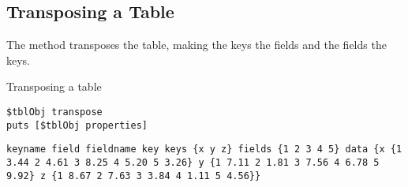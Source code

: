 \subsection{Transposing a Table}
The method  transposes the table, making the keys the fields and the fields the keys.
\begin{syntax}
\end{syntax}

\begin{example}{Transposing a table}
\begin{lstlisting}
$tblObj transpose
puts [$tblObj properties]
\end{lstlisting}
\tcblower
\begin{lstlisting}
keyname field fieldname key keys {x y z} fields {1 2 3 4 5} data {x {1 3.44 2 4.61 3 8.25 4 5.20 5 3.26} y {1 7.11 2 1.81 3 7.56 4 6.78 5 9.92} z {1 8.67 2 7.63 3 3.84 4 1.11 5 4.56}}
\end{lstlisting}
\end{example}
